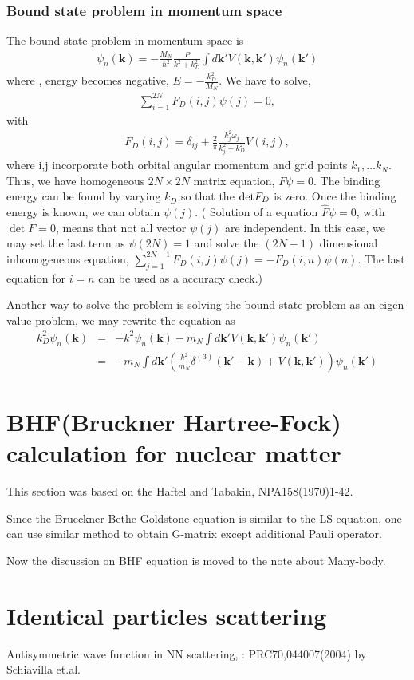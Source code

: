 \documentclass[10pt]{book}
\def\bm{\boldsymbol}
\newcommand{\bea}{\begin{eqnarray}}
\newcommand{\eea}{\end{eqnarray}}
\newcommand{\no}{\nonumber \\}
\def\vk{{\bm k}}
\begin{document}
\subsubsection{Bound state problem in momentum space}
The bound state problem in momentum space is
\bea
\psi_n(\vk)=-\frac{M_N}{\hbar^2}\frac{P}{k^2+k_D^2}\int d\vk'
      V(\vk,\vk')\psi_n(\vk')
\eea
where , energy becomes negative, $E=-\frac{k_D^2}{M_N}$.
We have to solve,
\bea
\sum_{i=1}^{2N} F_D(i,j)\psi(j)=0,
\eea
with
\bea
F_D(i,j)=\delta_{ij}+\frac{2}{\pi}\frac{k_j^2 \omega_j}{k_j^2+k_D^2}
          V(i,j),
\eea
where i,j incorporate both orbital angular momentum and
grid points $k_{1},\dots k_N$. Thus, we have
homogeneous $2N\times 2N$ matrix equation, $F\psi=0$.
The binding energy can be found by varying $k_D$ so that the
${\rm det} F_D$ is zero. Once the binding energy is known, 
we can obtain $\psi(j)$. ( Solution of a equation ${\hat{F}}\psi=0$,
with $\det F=0$, means that not all vector $\psi(j)$ are independent. 
In this case, we may set the last term as $\psi(2N)=1$ and solve the
$(2N-1)$ dimensional inhomogeneous equation, 
$\sum_{j=1}^{2N-1}F_D(i,j)\psi(j)=-F_D(i,n)\psi(n)$. The last equation for $i=n$
can be used as a accuracy check.) 

Another way to solve the problem is solving the bound state problem as an eigen-value problem,
we may rewrite the equation as
\bea 
k_D^2\psi_n(\vk)&=& -k^2 \psi_n(\vk)-m_N \int d\vk' V(\vk,\vk')\psi_n(\vk') \no 
        &=&-m_N \int d\vk'  \left( \frac{k^2}{m_N}\delta^{(3)}(\vk'-\vk)
            +V(\vk,\vk') \right) \psi_n(\vk')
\eea 

\newpage 
\section{BHF(Bruckner Hartree-Fock) calculation for nuclear matter}
This section was based on the Haftel and Tabakin, NPA158(1970)1-42. 

Since the Brueckner-Bethe-Goldstone equation is similar to the LS equation,
one can use similar method to obtain G-matrix except additional Pauli operator.

Now the discussion on BHF equation is moved to the note about Many-body. 

\newpage
\section{Identical particles scattering}
Antisymmetric wave function in 
NN scattering, 
: PRC70,044007(2004) by Schiavilla et.al.
\end{document}
